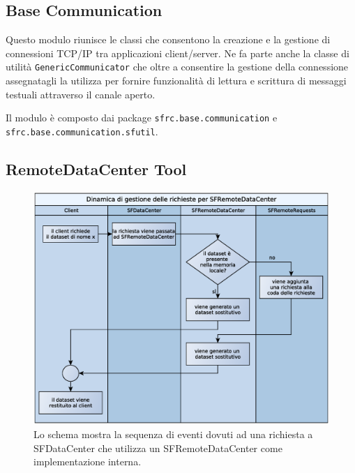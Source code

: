 
\subsection{Base Communication}
\label{sub:basecommodule}
Questo modulo riunisce le classi che consentono la creazione e la gestione di connessioni TCP/IP tra applicazioni client/server. Ne fa parte anche la classe di utilit\`a \texttt{GenericCommunicator} che oltre a consentire la gestione della connessione assegnatagli la utilizza per fornire funzionalit\`a di lettura e scrittura di messaggi testuali attraverso il canale aperto.

Il modulo \`e composto dai package \texttt{sfrc.base.communication} e \\\texttt{sfrc.base.communication.sfutil}.

\subsection{RemoteDataCenter Tool}
\label{sub:remotedatacentertoolmodule}

\begin{figure}
\begin{center}
\includegraphics[width=\textwidth]{Immagini/DinamicaSFRemoteDataCenter}
\caption{Lo schema mostra la sequenza di eventi dovuti ad una richiesta a SFDataCenter che utilizza un SFRemoteDataCenter come implementazione interna.\label{f:dinamicasfremotedatacenter}} 
\end{center} 
\end{figure}

